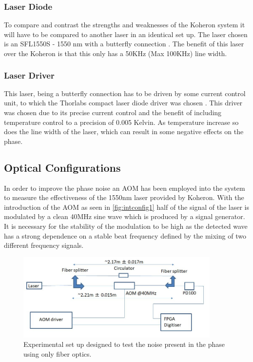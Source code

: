 \documentclass[12pt,a4paper,oneside]{report}
\begin{document}
\subsubsection{Laser Diode}
To compare and contrast the strengths and weaknesses of the Koheron system it will have to be compared to another laser in an identical set up. The laser chosen is an SFL1550S - 1550 nm with a butterfly connection \cite{ThorlabsFC/APC}. The benefit of this laser over the Koheron is that this only has a 50KHz (Max 100KHz) line width.

\subsubsection{Laser Driver}
This laser, being a butterfly connection has to be driven by some current control unit, to which the Thorlabs compact laser diode driver was chosen \cite{CompactPackages}. This driver was chosen due to its precise current control and the benefit of including temperature control to a precision of 0.005 Kelvin. As temperature increase so does the line width of the laser, which can result in some negative effects on the phase.

\subsection{Optical Configurations}
In order to improve the phase noise an AOM has been employed into the system to measure the effectiveness of the 1550nm laser provided by Koheron. With the introduction of the AOM \cite{Sell1550MODULATOR} as seen in \autoref{fig:intconfig1} half of the signal of the laser is modulated by a clean 40MHz sine wave which is produced by a signal generator. It is necessary for the stability of the modulation to be high as the detected wave has a strong dependence on a stable beat frequency defined by the mixing of two different frequency signals.

\begin{figure}[H] 
\includegraphics[width=0.9\textwidth, center,angle=0]{DImages/intconfig1.JPG}
\caption{Experimental set up designed to test the noise present in the phase using only fiber optics.}
\label{fig:intconfig1}
\end{figure}
\end{document}
